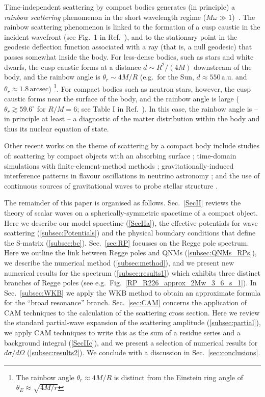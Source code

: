 \documentclass[aps,prd,longbibliography,reprint,twocolumn,amsmath,amssymb,amsfonts,showpacs,footnote,superscriptaddress]{revtex4-1}%
\begin{document}
Time-independent scattering by compact bodies generates (in principle) a \emph{rainbow scattering} phenomenon in the short wavelength regime ($M \omega \gg 1$)~\cite{Dolan:2017rtj, Stratton:2019deq}. The rainbow scattering phenomenon is linked to the formation of a cusp caustic in the incident wavefront (see Fig.~1 in Ref.~\cite{Stratton:2019deq}), and to the stationary point in the geodesic deflection function associated with a ray (that is, a null geodesic) that passes somewhat inside the body. For less-dense bodies, such as stars and white dwarfs, the cusp caustic forms at a distance $d \sim R^2 / (4M)$ downstream of the body, and the rainbow angle is $\theta_r \sim 4M/R$ (e.g.~for the Sun, $d \approx 550 \, \text{a.u.}$ and $\theta_r \approx 1.8 \, \text{arcsec}$) \footnote{The rainbow angle $\theta_r \approx 4M/R$ is distinct from the Einstein ring angle of $\theta_E \approx \sqrt{4M/r}$}. For compact bodies such as neutron stars, however, the cusp caustic forms near the surface of the body, and the rainbow angle is large ($\theta_r \gtrsim 59.6^\circ$ for $R/M = 6$; see Table I in Ref.~\cite{Stratton:2019deq}). In this case, the rainbow angle is -- in principle at least -- a diagnostic of the matter distribution within the body and thus its nuclear equation of state.

Other recent works on the theme of scattering by a compact body include studies of: scattering by compact objects with an absorbing surface \cite{Nambu:2019sqn}; time-domain simulations with finite-element-method methods \cite{He:2019orl}; gravitationally-induced interference patterns in flavour oscillations in neutrino astronomy \cite{Alexandre:2018crg}; and the use of continuous sources of gravitational waves to probe stellar structure \cite{Marchant:2019swq}.

The remainder of this paper is organised as follows. Sec.~\ref{SecII} reviews the theory of scalar waves on a spherically-symmetric spacetime of a compact object. Here we describe our model spacetime (\ref{SecIIa}), the effective potentials for wave scattering (\ref{subsec:Potentials}) and the physical boundary conditions that define the S-matrix (\ref{subsec:bc}). Sec.~\ref{sec:RP} focusses on the Regge pole spectrum. Here we outline the link between Regge poles and QNMs (\ref{subsec:QNMs_RPs}), we describe the numerical method (\ref{subsec:method}), and we present new numerical results for the spectrum (\ref{subsec:results1}) which exhibits three distinct branches of Regge poles (see e.g.~Fig.~\ref{RP_R226_approx_2Mw_3_6_s_1}). In Sec.~\ref{subsec:WKB} we apply the WKB method to obtain an approximate formula for the ``broad resonance'' branch. Sec.~\ref{sec:CAM} concerns the application of CAM techniques to the calculation of the scattering cross section. Here we review the standard partial-wave expansion of the scattering amplitude (\ref{subsec:partial}), we apply CAM techniques to write this as the sum of a residue series and a background integral (\ref{SecIIc}), and we present a selection of numerical results for $d\sigma/d\Omega$ (\ref{subsec:results2}). We conclude with a discussion in Sec.~\ref{sec:conclusions}.
\end{document}
